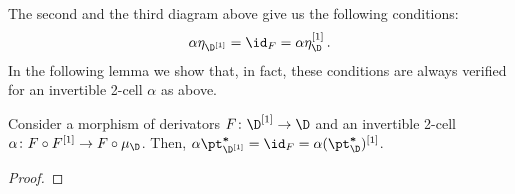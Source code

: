 %
The second and the third diagram above give us the following conditions:
$$\alpha\eta_{\D^{[1]}}=\id_F=\alpha\eta_\D^{[1]}\,.$$
In the following lemma we show that, in fact, these conditions are always verified for an invertible 2-cell $\alpha$ as above.

\begin{lemma}
Consider a morphism of derivators $F\colon \D^{[1]}\to \D$ and an invertible 2-cell $\alpha \colon F\circ F^{[1]}\to F \circ \mu_{\D} $. Then, $\alpha\pt^{\boldsymbol *}_{\D^{[1]}}=\id_F=\alpha(\pt^{\boldsymbol *}_\D)^{[1]}$.
\end{lemma}
\begin{proof}

\end{proof}


